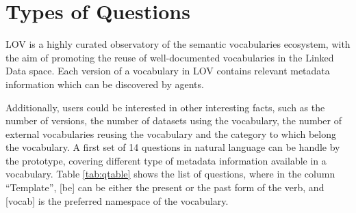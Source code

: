 \documentclass[runningheads,a4paper]{llncs}
\begin{document}
\section{Types of Questions}
\label{sec:questions}

LOV is a highly curated observatory of the semantic vocabularies ecosystem, with the aim of promoting the reuse of well-documented vocabularies in the Linked Data space. Each version of a vocabulary in LOV contains relevant metadata information which can be discovered by agents. 

Additionally, users could be interested in other interesting facts, such as the number of versions, the number of datasets  using the vocabulary, the number of external vocabularies reusing the vocabulary and the category to which belong the vocabulary. A first set of 14 questions in natural language can be handle by the prototype, covering different type of metadata information available in a vocabulary. Table \ref{tab:qtable} shows the list of questions, where in the column ``Template'', [be] can be either the present or the past form of the verb, and [vocab] is the preferred namespace of the vocabulary.    
\end{document}
